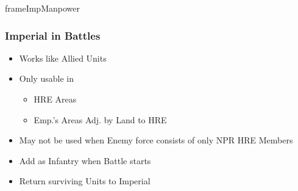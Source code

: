 \documentclass[10pt]{article}
\newlength{\fhImpManpower} \setlength\fhImpManpower{9\baselineskip}
\begin{document}
\begin{dynamiccontents*}{frameImpManpower}\begin{eubox}{\fhImpManpower}
	\subsubsection*{Imperial \manpower in Battles }
	\begin{itemize}
		\item Works like Allied Units
		\item Only usable in
		\begin{itemize}
			\item HRE Areas
			\item Emp.'s Areas Adj. by Land to HRE
		\end{itemize}
		\item May not be used when Enemy force consists of only NPR HRE Members
		\item Add as Infantry when Battle starts
		\item Return surviving Units to Imperial \manpower
	\end{itemize}
\end{eubox}\end{dynamiccontents*}
\end{document}

